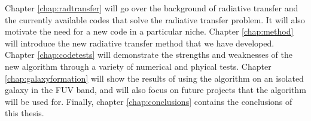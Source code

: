 Chapter \ref{chap:radtransfer} will go over the background of radiative transfer and the currently available codes that solve the radiative transfer problem. It will also motivate the need for a new code in a particular niche. Chapter \ref{chap:method} will introduce the new radiative transfer method that we have developed. Chapter \ref{chap:codetests} will demonstrate the strengths and weaknesses of the new algorithm through a variety of numerical and phyical tests. Chapter \ref{chap:galaxyformation} will show the results of using the algorithm on an isolated galaxy in the FUV band, and will also focus on future projects that the algorithm will be used for. Finally, chapter \ref{chap:conclusions} contains the conclusions of this thesis.
